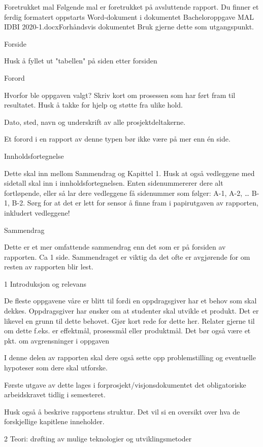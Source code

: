 Foretrukket mal
Følgende mal er foretrukket på avsluttende rapport. Du finner et ferdig formatert oppstarts Word-dokument i dokumentet Bacheloroppgave MAL IDBI 2020-1.docxForhåndsvis dokumentet Bruk gjerne dette som utgangspunkt.

 

Forside

Husk å fyllet ut "tabellen" på siden etter forsiden

Forord

Hvorfor ble oppgaven valgt? Skriv kort om prosessen som har ført fram til resultatet. Husk å takke for hjelp og støtte fra ulike hold.

Dato, sted, navn og underskrift av alle prosjektdeltakerne.

Et forord i en rapport av denne typen bør ikke være på mer enn én side.

Innholdsfortegnelse

Dette skal inn mellom Sammendrag og Kapittel 1. Husk at også vedleggene med sidetall skal inn i innholdsfortegnelsen. Enten sidenummererer dere alt fortløpende, eller så lar dere vedleggene få sidenummer som følger: A-1, A-2, … B-1, B-2. Sørg for at det er lett for sensor å finne fram i papirutgaven av rapporten, inkludert vedleggene!

Sammendrag

Dette er et mer omfattende sammendrag enn det som er på forsiden av rapporten. Ca 1 side. Sammendraget er viktig da det ofte er avgjørende for om resten av rapporten blir lest.

1 Introduksjon og relevans

De fleste oppgavene våre er blitt til fordi en oppdragsgiver har et behov som skal dekkes. Oppdragsgiver har ønsker om at studenter skal utvikle et produkt. Det er likevel en grunn til dette behovet. Gjør kort rede for dette her. Relater gjerne til om dette f.eks. er effektmål, prosessmål eller produktmål. Det bør også være et pkt. om avgrensninger i oppgaven

I denne delen av rapporten skal dere også sette opp problemstilling og eventuelle hypoteser som dere skal utforske.

Første utgave av dette lages i forprosjekt/visjonsdokumentet det obligatoriske arbeidskravet tidlig i semesteret.

Husk også å beskrive rapportens struktur. Det vil si en oversikt over hva de forskjellige kapitlene inneholder.

2 Teori: drøfting av mulige teknologier og utviklingsmetoder


